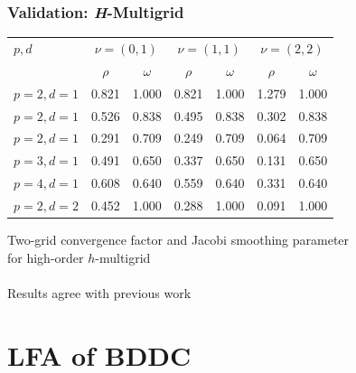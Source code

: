 \documentclass{beamer}
\begin{document}
\begin{frame}
\begin{center}
\frametitle{Validation: {\textit H}-Multigrid}

\begin{table}[ht!]
\begin{center}
\begin{tabular}{l cc cc cc}
  \toprule
  $p, d$  &  \multicolumn{2}{c}{$\nu = \left( 0, 1 \right)$}  &  \multicolumn{2}{c}{$\nu = \left( 1, 1 \right)$}  &  \multicolumn{2}{c}{$\nu = \left( 2, 2 \right)$}  \\
                      &  $\rho$  &  $\omega$  &  $\rho$ & $\omega$  &  $\rho$ & $\omega$  \\
  \toprule
  $p = 2, d = 1$  &  0.821 & 1.000  &  0.821 & 1.000  &  1.279 & 1.000   \\
  $p = 2, d = 1$  &  0.526 & 0.838  &  0.495 & 0.838  &  0.302 & 0.838   \\
  $p = 2, d = 1$  &  0.291 & 0.709  &  0.249 & 0.709  &  0.064 & 0.709   \\
  \midrule
  $p = 3, d = 1$  &  0.491 & 0.650  &  0.337 & 0.650  &  0.131 & 0.650   \\
  \midrule
  $p = 4, d = 1$  &  0.608 & 0.640  &  0.559 & 0.640  &  0.331 & 0.640   \\
  \midrule
  $p = 2, d = 2$  &  0.452 & 1.000  &  0.288 & 1.000  &  0.091 & 1.000   \\
  \bottomrule
\end{tabular}
\end{center}
\label{table:two_grid_hmultigrid}
\end{table}
{\small Two-grid convergence factor and Jacobi smoothing parameter\\for high-order $h$-multigrid}\\

~\\

Results agree with previous work \cite{he2020two}\\

\end{center}
\end{frame}

\section{LFA of BDDC}
\end{document}
